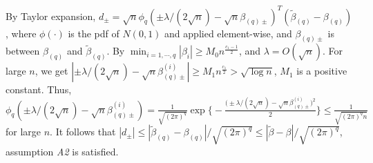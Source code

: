 \documentclass[10pt]{book}
\theoremstyle{definition}
\begin{document}
By Taylor expansion, $d_{\pm}=\sqrt{n}\phi_q(\pm \lambda/(2\sqrt{n}) - \sqrt{n}\beta_{(q)\pm})^T(\tilde{\beta}_{(q)}-\beta_{(q)})$, where $\phi(\cdot)$ is the pdf of $N(0,1)$ and applied element-wise, and $\beta_{(q)\pm}$ is between $\beta_{(q)}$ and $\tilde{\beta}_{(q)}$. 
By $\min_{i=1,\cdots,q}|\beta_i|\geq M_0 n^{\frac{c_1-1}{2}}$,  and $\lambda=O(\sqrt{n})$. For large $n$, we get $|\pm \lambda/(2\sqrt{n}) - \sqrt{n}\beta_{(q)\pm}^{(i)}|\geq M_1 n^{\frac{c_1}{2}} > \sqrt{ \log n}$, $M_1$ is a positive constant. Thus,
$\phi_q(\pm \lambda/(2\sqrt{n}) - \sqrt{n}\beta_{(q)\pm}^{(i)})=\frac{1}{\sqrt{(2\pi)^q}}\exp\bigg\{-\frac{\big(\pm \lambda/(2\sqrt{n}) - \sqrt{n}\beta_{(q)\pm}^{(i)}\big)^2}{2}\bigg\}
\leq\frac{1}{\sqrt{(2\pi)^q n}}$
for large $n$. It follows that $|d_{\pm}| \leq |\tilde{\beta}_{(q)}-\beta_{(q)}|/\sqrt{(2\pi)^q}\leq |\tilde{\beta}-\beta|/\sqrt{(2\pi)^q}$, assumption {\it A2} is satisfied. 
\end{document}
